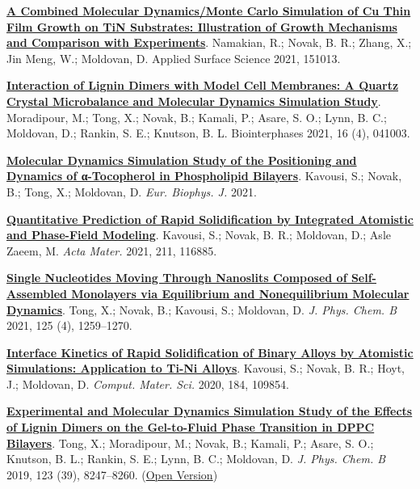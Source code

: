 
\begin{cventries}
  \cventry
    {} %
    {} %
    {} %
    {} %
    {
      \begin{cvitems} %
        \item{\href{https://authors.elsevier.com/c/1dlt0cXa~yxmX}{\textbf{A Combined Molecular Dynamics/Monte Carlo Simulation of Cu Thin Film Growth on TiN Substrates: Illustration of Growth Mechanisms and Comparison with Experiments}}. Namakian, R.; Novak, B. R.; Zhang, X.; Jin Meng, W.; Moldovan, D. Applied Surface Science 2021, 151013.}
        \item{\href{https://doi.org/10.1116/6.0001029}{\textbf{Interaction of Lignin Dimers with Model Cell Membranes: A Quartz Crystal Microbalance and Molecular Dynamics Simulation Study}}. Moradipour, M.; Tong, X.; Novak, B.; Kamali, P.; Asare, S. O.; Lynn, B. C.; Moldovan, D.; Rankin, S. E.; Knutson, B. L. Biointerphases 2021, 16 (4), 041003.}
        \item {\href{https://rdcu.be/clAtY}{\textbf{Molecular Dynamics Simulation Study of the Positioning and Dynamics of α-Tocopherol in Phospholipid Bilayers}}. Kavousi, S.; Novak, B.; Tong, X.; Moldovan, D. \textit{Eur. Biophys. J.} 2021.}
        \item{\href{https://doi.org/10.1016/j.actamat.2021.116885}{\textbf{Quantitative Prediction of Rapid Solidification by Integrated Atomistic and Phase-Field Modeling}}. Kavousi, S.; Novak, B. R.; Moldovan, D.; Asle Zaeem, M. \textit{Acta Mater.} 2021, 211, 116885.}
        \item {\href{https://doi.org/10.1021/acs.jpcb.0c07797}{\textbf{Single Nucleotides Moving Through Nanoslits Composed of Self-Assembled Monolayers via Equilibrium and Nonequilibrium Molecular Dynamics}}. Tong, X.; Novak, B.; Kavousi, S.; Moldovan, D. \textit{J. Phys. Chem. B} 2021, 125 (4), 1259–1270.}
        \item {\href{https://doi.org/10.1016/j.commatsci.2020.109854.}{\textbf{Interface Kinetics of Rapid Solidification of Binary Alloys by Atomistic Simulations: Application to Ti-Ni Alloys}}. Kavousi, S.; Novak, B. R.; Hoyt, J.; Moldovan, D. \textit{Comput. Mater. Sci.} 2020, 184, 109854.}
        \item {\href{https://doi.org/10.1021/acs.jpcb.9b05525}{\textbf{Experimental and Molecular Dynamics Simulation Study of the Effects of Lignin Dimers on the Gel-to-Fluid Phase Transition in DPPC Bilayers}}. Tong, X.; Moradipour, M.; Novak, B.; Kamali, P.; Asare, S. O.; Knutson, B. L.; Rankin, S. E.; Lynn, B. C.; Moldovan, D. \textit{J. Phys. Chem. B} 2019, 123 (39), 8247–8260. (\href{https://par.nsf.gov/servlets/purl/10149222}{Open Version})}

\end{cvitems}}
\end{cventries}
